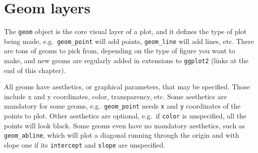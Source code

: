 \documentclass[]{book}
\newenvironment{Shaded}{}{}
\newcommand{\CommentTok}[1]{\textcolor[rgb]{0.38,0.63,0.69}{\textit{#1}}}
\newcommand{\DataTypeTok}[1]{\textcolor[rgb]{0.56,0.13,0.00}{#1}}
\newcommand{\KeywordTok}[1]{\textcolor[rgb]{0.00,0.44,0.13}{\textbf{#1}}}
\newcommand{\NormalTok}[1]{#1}
\newcommand{\OperatorTok}[1]{\textcolor[rgb]{0.40,0.40,0.40}{#1}}
\newcommand{\StringTok}[1]{\textcolor[rgb]{0.25,0.44,0.63}{#1}}
\begin{document}
\begin{Shaded}
\end{Shaded}

\hypertarget{geom-layers}{%
\section{Geom layers}\label{geom-layers}}

The \texttt{geom} object is the core visual layer of a plot, and it defines the type of plot being made, e.g.~\texttt{geom\_point} will add points, \texttt{geom\_line} will add lines, etc. There are tons of geoms to pick from, depending on the type of figure you want to make, and new geoms are regularly added in extensions to \texttt{ggplot2} (links at the end of this chapter).

All geoms have aesthetics, or graphical parameters, that may be specified. Those include x and y coordinates, color, transparency, etc. Some aesthetics are mandatory for some geoms, e.g.~\texttt{geom\_point} needs \texttt{x} and \texttt{y} coordinates of the points to plot. Other aesthetics are optional, e.g.~if \texttt{color} is unspecified, all the points will look black. Some geoms even have no mandatory aesthetics, such as \texttt{geom\_abline}, which will plot a diagonal running through the origin and with slope one if its \texttt{intercept} and \texttt{slope} are unspecified.
\end{document}
